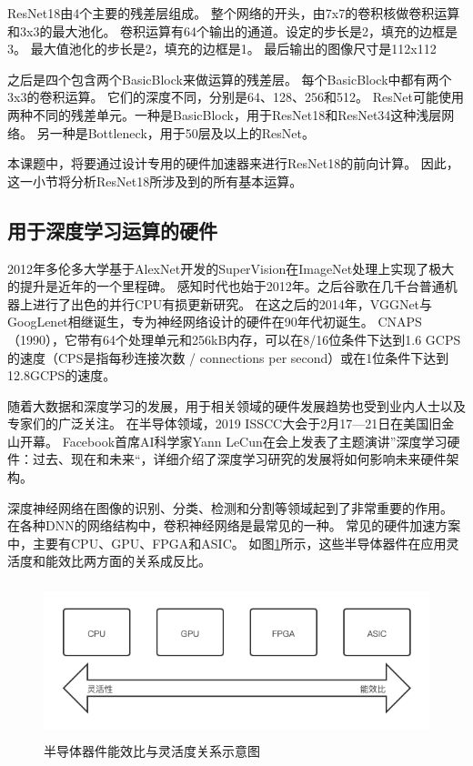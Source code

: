 ResNet18由4个主要的残差层组成。
整个网络的开头，由7x7的卷积核做卷积运算和3x3的最大池化。
卷积运算有64个输出的通道。设定的步长是2，填充的边框是3。
最大值池化的步长是2，填充的边框是1。
最后输出的图像尺寸是112x112

之后是四个包含两个BasicBlock来做运算的残差层。
每个BasicBlock中都有两个3x3的卷积运算。
它们的深度不同，分别是64、128、256和512。
ResNet可能使用两种不同的残差单元。一种是BasicBlock，用于ResNet18和ResNet34这种浅层网络。
另一种是Bottleneck，用于50层及以上的ResNet。

本课题中，将要通过设计专用的硬件加速器来进行ResNet18的前向计算。
因此，这一小节将分析ResNet18所涉及到的所有基本运算。


\subsection{用于深度学习运算的硬件}
2012年多伦多大学基于AlexNet开发的SuperVision在ImageNet处理上实现了极大的提升是近年的一个里程碑。%
感知时代也始于2012年。之后谷歌在几千台普通机器上进行了出色的并行CPU有损更新研究。
在这之后的2014年，VGGNet与GoogLenet相继诞生，专为神经网络设计的硬件在90年代初诞生。
CNAPS（1990），它带有64个处理单元和256kB内存，可以在8/16位条件下达到1.6 GCPS的速度（CPS是指每秒连接次数 / connections per second）或在1位条件下达到12.8GCPS的速度。%

随着大数据和深度学习的发展，用于相关领域的硬件发展趋势也受到业内人士以及专家们的广泛关注。
在半导体领域，2019 ISSCC大会于2月17—21日在美国旧金山开幕。
Facebook首席AI科学家Yann LeCun在会上发表了主题演讲”深度学习硬件：过去、现在和未来“，详细介绍了深度学习研究的发展将如何影响未来硬件架构。%

深度神经网络在图像的识别、分类、检测和分割等领域起到了非常重要的作用。
在各种DNN的网络结构中，卷积神经网络是最常见的一种。
常见的硬件加速方案中，主要有CPU、GPU、FPGA和ASIC。
如图\ref{fig:silicon_alternatives}所示，这些半导体器件在应用灵活度和能效比两方面的关系成反比。  
\begin{figure}[htbp]
    \centering
    \includegraphics[width=15cm,height=4.5cm]{figures/silicon_alternatives.png}
    \caption{半导体器件能效比与灵活度关系示意图}
    \label{fig:silicon_alternatives}
\end{figure}

